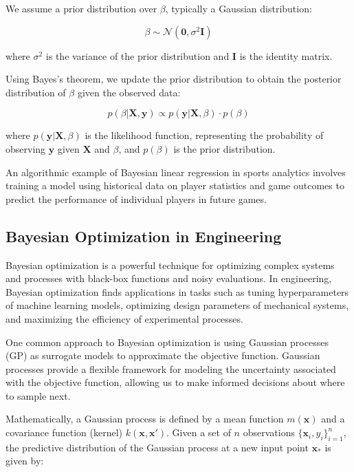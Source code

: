 \documentclass[12pt]{book} %
\begin{document}
We assume a prior distribution over \( \beta \), typically a Gaussian distribution:

\[
\beta \sim \mathcal{N}(\mathbf{0}, \sigma^2\mathbf{I})
\]

where \( \sigma^2 \) is the variance of the prior distribution and \( \mathbf{I} \) is the identity matrix.

Using Bayes's theorem, we update the prior distribution to obtain the posterior distribution of \( \beta \) given the observed data:

\[
p(\beta | \mathbf{X}, \mathbf{y}) \propto p(\mathbf{y} | \mathbf{X}, \beta) \cdot p(\beta)
\]

where \( p(\mathbf{y} | \mathbf{X}, \beta) \) is the likelihood function, representing the probability of observing \( \mathbf{y} \) given \( \mathbf{X} \) and \( \beta \), and \( p(\beta) \) is the prior distribution.

An algorithmic example of Bayesian linear regression in sports analytics involves training a model using historical data on player statistics and game outcomes to predict the performance of individual players in future games.

\subsection{Bayesian Optimization in Engineering}

Bayesian optimization is a powerful technique for optimizing complex systems and processes with black-box functions and noisy evaluations. In engineering, Bayesian optimization finds applications in tasks such as tuning hyperparameters of machine learning models, optimizing design parameters of mechanical systems, and maximizing the efficiency of experimental processes.

One common approach to Bayesian optimization is using Gaussian processes (GP) as surrogate models to approximate the objective function. Gaussian processes provide a flexible framework for modeling the uncertainty associated with the objective function, allowing us to make informed decisions about where to sample next.

Mathematically, a Gaussian process is defined by a mean function \( m(\mathbf{x}) \) and a covariance function (kernel) \( k(\mathbf{x}, \mathbf{x'}) \). Given a set of \( n \) observations \( \{\mathbf{x}_i, y_i\}_{i=1}^n \), the predictive distribution of the Gaussian process at a new input point \( \mathbf{x}_* \) is given by:
\end{document}
